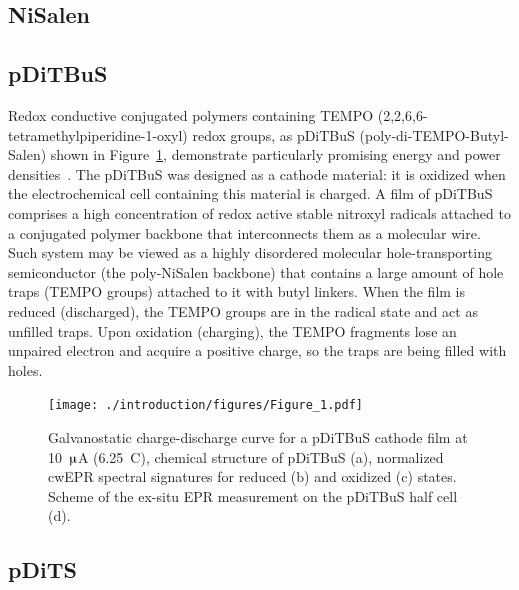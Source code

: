 \subsection{NiSalen}



\subsection{pDiTBuS}
Redox conductive conjugated polymers containing TEMPO (2,2,6,6-tetramethylpiperidine-1-oxyl) redox groups, as pDiTBuS (poly-di-TEMPO-Butyl-Salen) shown in Figure~\ref{fig:Figure_1}, demonstrate particularly promising energy and power densities~\cite{Vereshchagin2020}. The pDiTBuS was designed as a cathode material: it is oxidized when the electrochemical cell containing this material is charged. A film of pDiTBuS comprises a high concentration of redox active stable nitroxyl radicals attached to a conjugated polymer backbone that interconnects them as a molecular wire. Such system may be viewed as a highly disordered molecular hole-transporting semiconductor (the poly-NiSalen backbone) that contains a large amount of hole traps (TEMPO groups) attached to it with butyl linkers. When the film is reduced (discharged), the TEMPO groups are in the radical state and act as unfilled traps. Upon oxidation (charging), the TEMPO fragments lose an unpaired electron and acquire a positive charge, so the traps are being filled with holes.

\begin{figure}[h]
\center
	\texttt{[image: ./introduction/figures/Figure\_1.pdf]}
	\caption{Galvanostatic charge-discharge curve for a pDiTBuS cathode film at 10~$\muup$A (6.25~C), chemical structure of pDiTBuS (a), normalized cwEPR spectral signatures for reduced (b) and oxidized (c) states. Scheme of the ex-situ EPR measurement on the pDiTBuS half cell (d).}
	\label{fig:Figure_1}
\end{figure}

\subsection{pDiTS}

